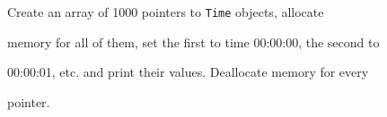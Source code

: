 Create an array of 1000 pointers to \texttt{Time} objects, allocate

memory for all of them, set the first to time 00:00:00, the second to

00:00:01, etc. and print their values. Deallocate memory for every

pointer.

